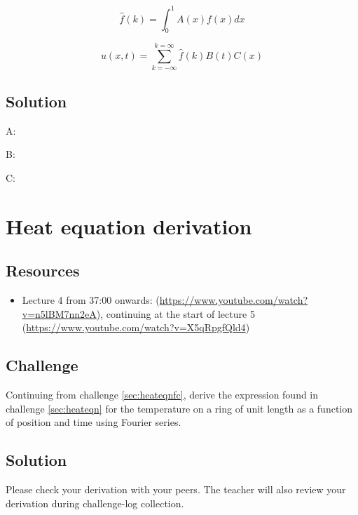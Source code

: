 \begin{equation}
    \hat{f}(k) = \int_0^1 A(x) f(x) dx
\end{equation}

\begin{equation}
    u(x,t) = \sum_{k=-\infty}^{k=\infty} \hat{f}(k) B(t) C(x)
\end{equation}

\subsection*{Solution}
A: 

B: 

C: 

\timebox




\newpage
\section{Heat equation derivation}

\subsection*{Resources}
\begin{itemize}
    \item Lecture 4 from 37:00 onwards: (\url{https://www.youtube.com/watch?v=n5lBM7nn2eA}), continuing at the start of lecture 5 (\url{https://www.youtube.com/watch?v=X5qRpgfQld4})
\end{itemize}

\subsection*{Challenge}
Continuing from challenge \ref{sec:heateqnfc}, derive the expression found in challenge \ref{sec:heateqn} for the temperature on a ring of unit length as a function of position and time using Fourier series.

\subsection*{Solution}
Please check your derivation with your peers. The teacher will also review your derivation during challenge-log collection.

\timebox




